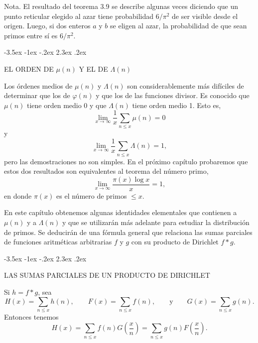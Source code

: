 \documentclass[12pt,a4paper]{book}
\makeatletter
\renewcommand\section{\@startsection{section}{1}{\z@}%
  {-3.5ex \@plus -1ex \@minus -.2ex}%
  {2.3ex \@plus .2ex}%
  {\normalfont\Large\bfseries\raggedright}}
\makeatother
\begin{document}
    Nota. El resultado del teorema 3.9 se describe algunas veces diciendo que un punto
    reticular elegido al azar tiene probabilidad $6/\pi^{2}$ de ser visible desde el origen.
    Luego, si dos enteros $a$ y $b$ se eligen al azar, la probabilidad de que sean primos
    entre sí es $6/\pi^{2}$.

    \section{EL ORDEN DE \texorpdfstring{$\mu(n)$}{μ(n)} Y EL DE \texorpdfstring{$\Lambda(n)$}{Λ(n)}}

    Los órdenes medios de $\mu(n)$ y $\Lambda(n)$ son considerablemente más difíciles de
    determinar que los de $\varphi(n)$ y que los de las funciones divisor. Es conocido que
    $\mu(n)$ tiene orden medio 0 y que $\Lambda(n)$ tiene orden medio 1. Esto es,
    \begin{equation*}
        \lim_{x\to\infty}\frac{1}{x}\sum_{n\leq x}\mu(n)=0
    \end{equation*}
    y
    \begin{equation*}
        \lim_{x\to\infty}\frac{1}{x}\sum_{n\leq x}\Lambda(n)=1,
    \end{equation*}
    pero las demostraciones no son simples. En el próximo capítulo probaremos que estos
    dos resultados son equivalentes al teorema del número primo,
    \begin{equation*}
        \lim_{x\to\infty}\frac{\pi(x)\log x}{x}=1,
    \end{equation*}
    en donde $\pi(x)$ es el número de primos $\leq x$.

    En este capítulo obtenemos algunas identidades elementales que contienen a $\mu(n)$ y
    a $\Lambda(n)$ y que se utilizarán más adelante para estudiar la distribución de
    primos. Se deducirán de una fórmula general que relaciona las sumas parciales de
    funciones aritméticas arbitrarias $f$ y $g$ con su producto de Dirichlet $f*g$.

    \section{LAS SUMAS PARCIALES DE UN PRODUCTO DE DIRICHLET}
    \begin{teorema}
        Si $h=f*g$, sea
        \begin{equation*}
            H(x)=\sum_{n\leq x}h(n),\qquad F(x)=\sum_{n\leq x}f(n),\qquad\text{y}\qquad
            G(x)=\sum_{n\leq x}g(n).
        \end{equation*}
        Entonces tenemos
        \begin{equation}
            H(x)=\sum_{n\leq x}f(n)G\left(\frac{x}{n}\right)=\sum_{n\leq x}g(n)F\left(\frac{x}{n}\right).
        \end{equation}
    \end{teorema}
\end{document}

